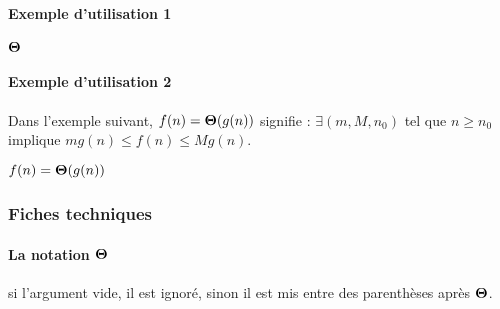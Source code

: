 \documentclass[12pt,a4paper]{article}
\begin{document}
\paragraph{Exemple d'utilisation 1}

\begin{latexex}
$\bigtheta{}$
\end{latexex}




\paragraph{Exemple d'utilisation 2}

Dans l'exemple suivant, $f(n) = \bigtheta{g(n)}$ signifie : $\exists (m, M, n_0)$ tel que $n \geqslant n_0$ implique $m g(n) \leqslant f(n) \leqslant M g(n)$.

\begin{latexex}
$f(n) = \bigtheta{g(n)}$
\end{latexex}




\subsubsection{Fiches techniques}

\paragraph{\texorpdfstring{La notation $\bigtheta{}$}%
                          {La notation "grand Theta"}}


\IDarg{} si l'argument vide, il est ignoré, sinon il est mis entre des parenthèses après $\bigtheta{}$.
\end{document}
